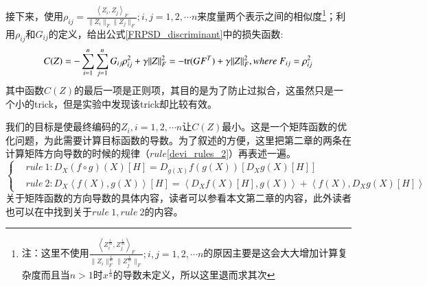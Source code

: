接下来，使用$\rho_{ij}=\frac{\left<Z_{i},Z_{j}\right>_{F}}{\|Z_{i}\|_{F}\|Z_{j}\|_{F}};i,j=1,2,\cdots n$来度量两个表示之间的相似度\footnote{注：这里不使用$\frac{\left<Z_{i}^{\frac{1}{m}},Z_{j}^{\frac{1}{m}}\right>_{F}}{\|Z_{i}\|_{F}^{\frac{1}{m}}\|Z_{j}^{\frac{1}{m}}\|_{F}};i,j=1,2,\cdots n$的原因主要是这会大大增加计算复杂度而且当$n>1$时$x^{\frac{1}{n}}$的导数未定义，所以这里退而求其次}；利用$\rho_{ij}$和$G_{ij}$的定义，给出公式\ref{FRPSD_discriminant}中的损失函数:
\begin{equation}
\label{FRPSD_discriminant}
C(Z)=-\sum_{i=1}^{n}\sum_{j=1}^{n}G_{ij}\rho_{ij}^{2}+\gamma\|Z\|_{F}^{2}=-{\rm tr}(GF^{T})+\gamma\|Z\|_{F}^{2},where~F_{ij}=\rho_{ij}^{2}
\end{equation}
其中函数$C(Z)$的最后一项是正则项，其目的是为了防止过拟合，这虽然只是一个小的trick，但是实验中发现该trick却比较有效。

我们的目标是使最终编码的$Z_{i}, i=1,2,\cdots n$让$C(Z)$最小。这是一个矩阵函数的优化问题，为此需要计算目标函数的导数。为了叙述的方便，这里把第二章的两条在计算矩阵方向导数的时候的规律（$rule$\ref{devi_rules_2}）再表述一遍。
\begin{displaymath}
\label{devi_rules}
\left\{
\begin{split}
&rule~1:D_{X}(f\circ g)(X)[H]=D_{g(X)}f(g(X))[D_{X}g(X)[H]]\\
&rule~2:D_{X}\left<f(X),g(X)\right>[H]=\left<D_{X}f(X)[H],g(X)\right>+\left<f(X),D_{X}g(X)[H]\right>
\end{split}
\right.
\end{displaymath}
关于矩阵函数的方向导数的具体内容，读者可以参看本文第二章的内容，此外读者也可以在\cite{Maniopt_DiscreteCurveFitting}中找到关于$rule~1,rule~2$的内容。

